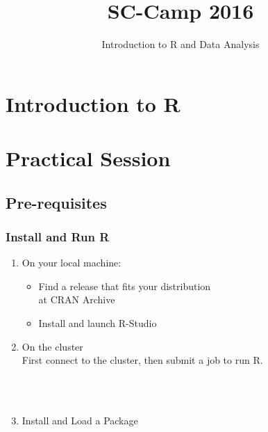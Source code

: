 \documentclass{beamer}
\title{SC-Camp 2016}
\subtitle{Introduction to R and Data Analysis}
\author{\authors}
\institute[ANEC]{
  ANEC, Luxembourg\\
  (Formerly University of Luxembourg)
}
\date{}
\begin{document}
\begin{frame}
    \vspace{2.5em}
    \titlepage
\end{frame}



\section{Introduction to R}






\section{Practical Session}
\subsection{Pre-requisites}

\begin{frame}[fragile]
    \frametitle{Install and Run R}
    \begin{enumerate}
      \item On your local machine:
		\begin{itemize}
			\item Find a release that fits your distribution\\ at CRAN Archive\hfill{}
			\item Install and launch R-Studio\hfill{}
		\end{itemize}
      \item On the cluster\\
       First connect to the cluster, then submit a job to run R.
        \begin{cmdline}
            \\
            \\
        \end{cmdline}
        \item Install and Load a Package
            \begin{cmdline}
              \\
              \\
            \end{cmdline}
    \end{enumerate}
\end{frame}
\end{document}
